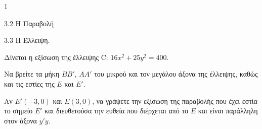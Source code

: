 \begin{ylh}{1}
    \item 3.2 Η Παραβολή
    \item 3.3 Η Έλλειψη.
\end{ylh}
Δίνεται η εξίσωση της έλλειψης C: $16x^2 + 25y^2 = 400$.
\begin{alist}
\item Να βρείτε τα μήκη $BB'$, $AA'$ του μικρού και τον μεγάλου άξονα της έλλειψης, καθώς και τις εστίες της $E$ και $E'$. 
\item Αν $E'(-3,0)$ και $E(3,0)$, να γράψετε την εξίσωση της παραβολής που έχει εστία το σημείο $E'$ και διευθετούσα την ευθεία που διέρχεται από το $E$ και είναι παράλληλη στον άξονα $y'y$. 
\end{alist}